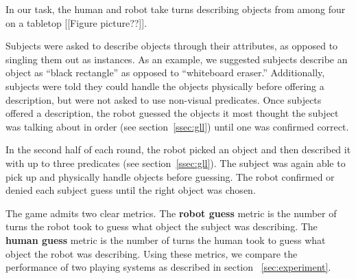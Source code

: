In our \ispy task, the human and robot take turns describing objects from among four on a tabletop [[Figure picture??]].

Subjects were asked to describe objects through their attributes, as opposed to singling them out as instances.
As an example, we suggested subjects describe an object as ``black rectangle'' as opposed to ``whiteboard eraser.''
Additionally, subjects were told they could handle the objects physically before offering a description, but were not asked to use non-visual predicates.
Once subjects offered a description, the robot guessed the objects it most thought the subject was talking about in order (see section~\ref{ssec:gll}) until one was confirmed correct.

In the second half of each round, the robot picked an object and then described it with up to three predicates (see section~\ref{ssec:gll}).
The subject was again able to pick up and physically handle objects before guessing.
The robot confirmed or denied each subject guess  until the right object was chosen.

The \ispy game admits two clear metrics.
The \textbf{robot guess} metric is the number of turns the robot took to guess what object the subject was describing.
The \textbf{human guess} metric is the number of turns the human took to guess what object the robot was describing.
Using these metrics, we compare the performance of two \ispy playing systems as described in section ~\ref{sec:experiment}.
